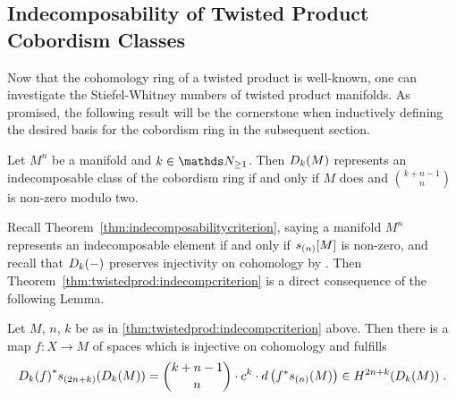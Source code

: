 \subsection{Indecomposability of Twisted Product Cobordism Classes}
\label{sec:twistedprod:indecompcriterion}
Now that the cohomology ring of a twisted product is well-known, one
can investigate the Stiefel-Whitney numbers of twisted product manifolds.
As promised, the following result will be the cornerstone when inductively
defining the desired basis for the cobordism ring in the subsequent section.
\begin{Thm}\label{thm:twistedprod:indecompcriterion}
  Let $M^n$ be a manifold and $k\in\Nat_{\geq1}$.
  Then $D_{k}({M})$ represents an indecomposable class of the
  cobordism ring if and only if $M$ does and $\binom{k+n-1}{n}$ is
  non-zero modulo two.
\end{Thm}
Recall Theorem~\autoref{thm:indecomposabilitycriterion}, saying
a manifold $M^n$ represents an indecomposable element if and only if
$s_{(n)}[M]$ is non-zero,
and recall that $D_{k}({-})$ preserves injectivity on
cohomology by
.
Then Theorem~\autoref{thm:twistedprod:indecompcriterion} is a
direct consequence of the following Lemma.
\begin{Lem}\label{lem:twistedprod:indecompcriterion}
  Let $M$, $n$, $k$ be as in
  \autoref{thm:twistedprod:indecompcriterion} above.
  Then there is a map $f\colon X\to M$ of spaces which is injective on
  cohomology and fulfills
  \begin{gather*}
    {D_{k}({f})}^* s_{(2n+k)}(D_{k}({M}))
    = \binom{k+n-1}{n} \cdot c^k
    \cdot d\left( {f}^* s_{(n)}(M) \right)
    \in H^{2n+k}(D_{k}({M}))
    \;.
  \end{gather*}
\end{Lem}
